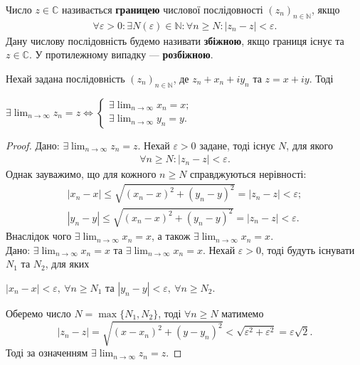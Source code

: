 \documentclass{math_library}
\begin{document}
\begin{definition}
Число $z \in \mathbb{C}$ називається \textbf{границею} числової послідовності $(z_n)_{n \in \mathbb{N}}$, якщо
\begin{align*}
\forall \varepsilon > 0: \exists N(\varepsilon) \in \mathbb{N}: \forall n \geq N: |z_n-z| < \varepsilon.
\end{align*}
Дану числову послідовність будемо називати \textbf{збіжною}, якщо границя існує та $z \in \mathbb{C}$. У протилежному випадку --- \textbf{розбіжною}.
\end{definition}

\begin{proposition}
Нехай задана послідовність $(z_n)_{n \in \mathbb{N}}$, де $z_n + x_n + iy_n$ та $z = x+iy$. Тоді
\begin{center}
$\exists \displaystyle\lim_{n \to \infty} z_n = z\iff \begin{cases} \displaystyle \exists \lim_{n \to \infty} x_n = x; \\ \exists \displaystyle  \lim_{n \to \infty} y_n = y. \end{cases}$
\end{center}
\end{proposition}

\begin{proof}
\rightproof Дано: $\exists \displaystyle\lim_{n \to \infty} z_n = z$. Нехай $\varepsilon > 0$ задане, тоді існує $N$, для якого
\begin{align*}
\forall n \geq N: |z_n-z| < \varepsilon.
\end{align*}
Однак зауважимо, що для кожного $n \geq N$ справджуються нерівності:
\begin{align*}
|x_n - x| \leq \sqrt{(x_n-x)^2 + (y_n-y)^2} = |z_n - z| < \varepsilon; \\
|y_n - y| \leq \sqrt{(x_n-x)^2 + (y_n-y)^2} = |z_n - z| < \varepsilon.
\end{align*}
Внаслідок чого $\exists \displaystyle\lim_{n \to \infty} x_n = x$, а також $\exists \displaystyle\lim_{n \to \infty} x_n = x$.
\bigskip \\
\leftproof Дано: $\exists \displaystyle\lim_{n \to \infty} x_n = x$ та $\exists \displaystyle\lim_{n \to \infty} x_n = x$. Нехай $\varepsilon > 0$, тоді будуть існувати $N_1$ та $N_2$, для яких
\begin{center}
$|x_n - x| < \varepsilon,\ \forall n \geq N_1$ та $|y_n-y| < \varepsilon,\ \forall n \geq N_2$.
\end{center}
Оберемо число $N = \max\{N_1,N_2\}$, тоді $\forall n \geq N$ матимемо
\[
|z_n - z| = \sqrt{(x-x_n)^2 + (y-y_n)^2} < \sqrt{\varepsilon^2 + \varepsilon^2} = \varepsilon \sqrt{2}.
\]
Тоді за означенням $\exists \displaystyle\lim_{n \to \infty} z_n = z$.
\end{proof}
\end{document}
